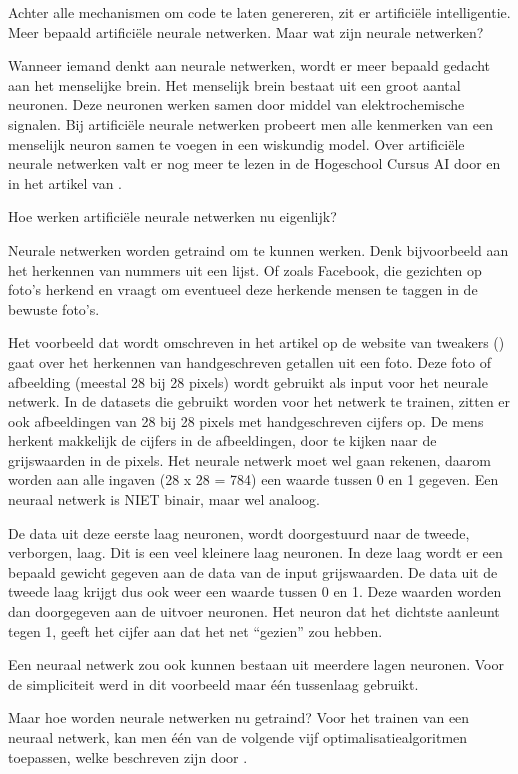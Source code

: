Achter alle mechanismen om code te laten genereren, zit er artificiële intelligentie. Meer bepaald artificiële neurale netwerken. Maar wat zijn neurale netwerken? 

Wanneer iemand denkt aan neurale netwerken, wordt er meer bepaald gedacht aan het menselijke brein. Het menselijk brein bestaat uit een groot aantal neuronen. Deze neuronen werken samen door middel van elektrochemische signalen. Bij artificiële neurale netwerken probeert men alle kenmerken van een menselijk neuron samen te voegen in een wiskundig model. Over artificiële neurale netwerken valt er nog meer te lezen in de Hogeschool Cursus AI door \textcite{cursusAI} en in het artikel van \textcite{techpulse}.

Hoe werken artificiële neurale netwerken nu eigenlijk? 

Neurale netwerken worden getraind om te kunnen werken. Denk bijvoorbeeld aan het herkennen van nummers uit een lijst. Of zoals Facebook, die gezichten op foto’s herkend en vraagt om eventueel deze herkende mensen te taggen in de bewuste foto’s. 

Het voorbeeld dat wordt omschreven in het artikel op de website van tweakers (\textcite{tweakers}) gaat over het herkennen van handgeschreven getallen uit een foto. Deze foto of afbeelding (meestal 28 bij 28 pixels) wordt gebruikt als input voor het neurale netwerk. In de datasets die gebruikt worden voor het netwerk te trainen, zitten er ook afbeeldingen van 28 bij 28 pixels met handgeschreven cijfers op. De mens herkent makkelijk de cijfers in de afbeeldingen, door te kijken naar de grijswaarden in de pixels. Het neurale netwerk moet wel gaan rekenen, daarom worden aan alle ingaven (28 x 28 = 784) een waarde tussen 0 en 1 gegeven. Een neuraal netwerk is NIET binair, maar wel analoog. 

De data uit deze eerste laag neuronen, wordt doorgestuurd naar de tweede, verborgen, laag. Dit is een veel kleinere laag neuronen. In deze laag wordt er een bepaald gewicht gegeven aan de data van de input grijswaarden. De data uit de tweede laag krijgt dus ook weer een waarde tussen 0 en 1. Deze waarden worden dan doorgegeven aan de uitvoer neuronen. Het neuron dat het dichtste aanleunt tegen 1, geeft het cijfer aan dat het net “gezien” zou hebben. 

Een neuraal netwerk zou ook kunnen bestaan uit meerdere lagen neuronen. Voor de simpliciteit werd in dit voorbeeld maar één tussenlaag gebruikt.

Maar hoe worden neurale netwerken nu getraind? Voor het trainen van een neuraal netwerk, kan men één van de volgende vijf optimalisatiealgoritmen toepassen, welke beschreven zijn door \textcite{neuraldesigners}.

